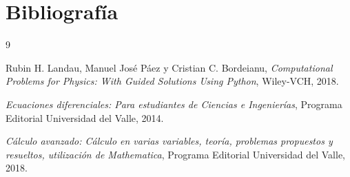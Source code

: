 \documentclass[12pt, a4paper]{article}
\begin{document}
\section{Bibliografía}

\begin{thebibliography}{9}

Rubin H. Landau, Manuel José Páez y Cristian C. Bordeianu,
\textit{Computational Problems for Physics: With Guided Solutions Using Python},
Wiley-VCH, 2018.

\textit{Ecuaciones diferenciales: Para estudiantes de Ciencias e Ingenierías},
Programa Editorial Universidad del Valle,
2014.


\textit{Cálculo avanzado: Cálculo en varias variables, teoría, problemas propuestos y resueltos, utilización de Mathematica},
Programa Editorial Universidad del Valle,
2018.

\end{thebibliography}
\end{document}
